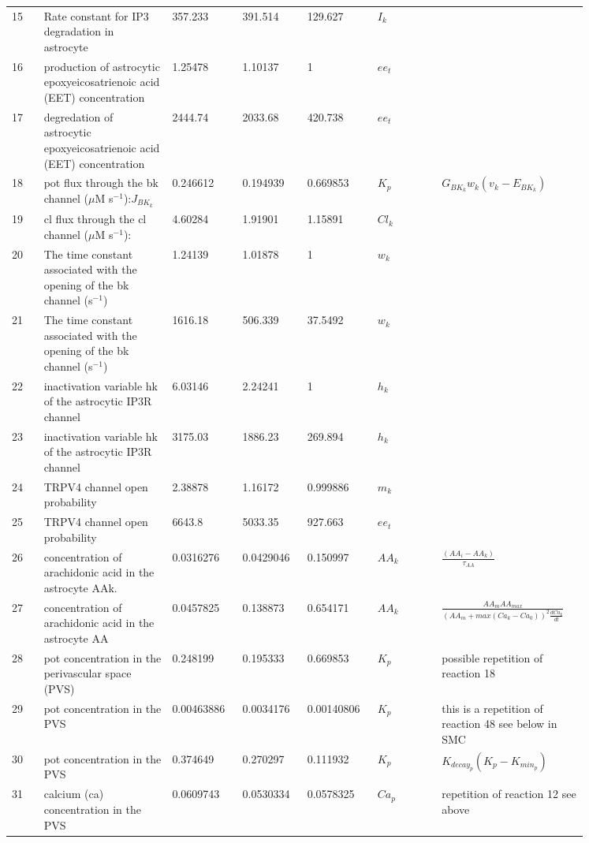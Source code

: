 \documentclass[]{article}
\newcommand{\mus}{$\mu$M s$^{-1}$\xspace}
\newcommand{\psec}{s$^{-1}$\xspace}
\newcommand{\pot}{\gls{pot}\xspace}
\newcommand{\cl}{\gls{cl}\xspace}
\newcommand{\ca}{\gls{ca}\xspace}
\begin{document}
\begin{longtable}[h!] { p{0.05\linewidth}  p{0.2\linewidth} p{0.1\linewidth}  p{0.10\linewidth} p{0.10\linewidth} p{0.1\linewidth}   p{0.2\linewidth} }
15&	Rate constant for IP3 degradation in astrocyte	&357.233	&	391.514	&	129.627&	$I_k$&\\
16&	production of astrocytic epoxyeicosatrienoic acid (EET) concentration&	1.25478	&	1.10137	&	1&	$ee_t$&\\
17	&degredation of astrocytic epoxyeicosatrienoic acid (EET) concentration	&2444.74	&	2033.68	&	420.738	&$ee_t$&\\
18&	\pot flux through the \gls{bk} channel (\mus):$J_{BK_k}$&	0.246612	&	0.194939	&	0.669853&	$K_p$&$  G_{BK_k}w_k\left( v_k-E_{BK_k} \right)$\\
19	&\cl flux through the \cl channel (\mus):	&4.60284	&	1.91901	&	1.15891	&$Cl_k$&\\
20	&The time constant associated with the opening of the \gls{bk} channel (\psec) &	1.24139		&1.01878	&	1&	$w_k$&\\
21	&The time constant associated with the opening of the \gls{bk} channel (\psec) &	1616.18	&	506.339	&	37.5492	&$w_k$&\\
22&	inactivation variable hk of the astrocytic IP3R channel	&6.03146	&	2.24241	&	1&	$h_k$&\\
23	&inactivation variable hk of the astrocytic IP3R channel&	3175.03	&	1886.23	&	269.894	&$h_k$&\\
24&	TRPV4 channel open probability&	2.38878	&	1.16172	&	0.999886&	$m_k$&\\
25&	TRPV4 channel open probability	&6643.8	&	5033.35	&	927.663&	$ee_t$&\\
26&	concentration of arachidonic acid in the astrocyte AAk.	&0.0316276	&	0.0429046	&	0.150997&	$AA_k$&$\frac{(AA_i - AA_k)}{\tau_{AA}}$\\
27	&concentration of arachidonic acid in the astrocyte AA &	0.0457825	&	0.138873	&	0.654171&	$AA_k$&$\frac{AA_m  AA_{max}}{(AA_m + max(Ca_k - Ca_0))^2 \frac{dCa_k}{dt}} $ \\
28	&\pot concentration in the perivascular space (PVS)	&0.248199	&	0.195333	&	0.669853&	$K_p$& possible repetition of reaction 18 \\
29&	\pot concentration in the PVS	&0.00463886	&	0.0034176	&	0.00140806&	$K_p$& this is a repetition of reaction 48 see below in SMC\\
30&	\pot concentration in the PVS	&0.374649	&	0.270297	&	0.111932&	$K_p$ &$K_{decay_p} (K_p - K_{min_p})$\\
31	&calcium (\ca) concentration in the PVS&	0.0609743	&	0.0530334	&	0.0578325&	$Ca_p$ &{repetition of reaction 12 see above}\\

\end{longtable}
\end{document}
